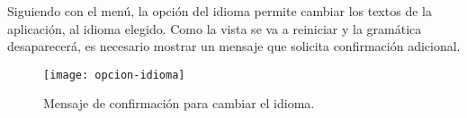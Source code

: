 Siguiendo con el menú, la opción del idioma permite cambiar los textos de la aplicación, al idioma elegido. Como la vista se va a reiniciar y la gramática desaparecerá, es necesario mostrar un mensaje que solicita confirmación adicional.

\begin{figure}[h]
\centering
\texttt{[image: opcion-idioma]}
\caption{Mensaje de confirmación para cambiar el idioma.}
\label{fig:6.9}
\end{figure}


